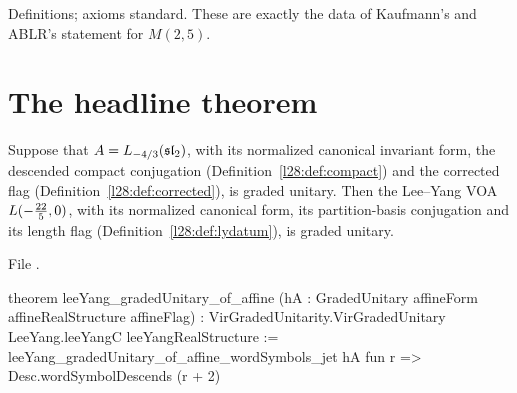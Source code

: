 \begin{status}
Definitions; axioms standard. These are exactly the data of Kaufmann's and ABLR's statement for $M(2,5)$.
\end{status}

\section{The headline theorem}\label{l28:sec:headline}

\begin{theorem}\label{l28:thm:headline}
Suppose that $A=L_{-4/3}(\mathfrak{sl}_2)$, with its normalized canonical invariant form, the descended compact conjugation
(Definition~\ref{l28:def:compact}) and the corrected flag (Definition~\ref{l28:def:corrected}), is graded unitary. Then the
Lee--Yang VOA $L(-\tfrac{22}{5},0)$, with its normalized canonical form, its partition-basis conjugation and its length flag
(Definition~\ref{l28:def:lydatum}), is graded unitary.
\end{theorem}

\noindent File .
\begin{leancode}
theorem leeYang_gradedUnitary_of_affine
    (hA : GradedUnitary affineForm affineRealStructure affineFlag) :
    VirGradedUnitarity.VirGradedUnitary LeeYang.leeYangC leeYangRealStructure :=
  leeYang_gradedUnitary_of_affine_wordSymbols_jet hA fun r => Desc.wordSymbolDescends (r + 2)
\end{leancode}

